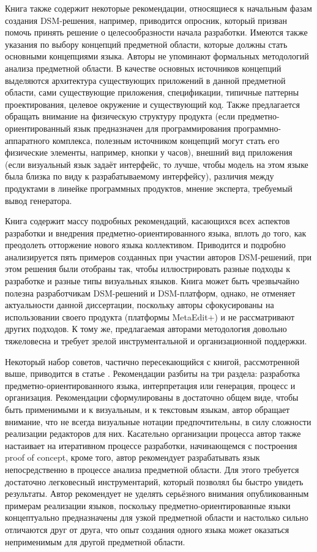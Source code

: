 Книга также содержит некоторые рекомендации, относящиеся к начальным фазам создания 
\ac{DSM}-решения, например, приводится опросник, который призван помочь принять решение о 
целесообразности начала разработки. Имеются также указания по выбору концепций предметной 
области, которые должны стать основными концепциями языка. Авторы не упоминают формальных 
методологий анализа предметной области. В качестве основных источников концепций выделяются 
архитектура существующих приложений в данной предметной области, сами существующие приложения, 
спецификации, типичные паттерны проектирования, целевое окружение и существующий код.
 Также предлагается обращать внимание на физическую структуру продукта (если предметно-ориентированный 
язык предназначен для программирования программно-аппаратного комплекса, полезным 
источником концепций могут стать его физические элементы, например, кнопки у часов), 
внешний вид приложения (если визуальный язык задаёт интерфейс, то лучше, чтобы модель 
на этом языке была близка по виду к разрабатываемому интерфейсу), различия между продуктами 
в линейке программных продуктов, мнение эксперта, требуемый вывод генератора.

Книга содержит массу подробных рекомендаций, касающихся всех аспектов разработки и 
внедрения предметно-ориентированного языка, вплоть до того, как преодолеть отторжение 
нового языка коллективом. Приводится и подробно анализируется пять примеров созданных 
при участии авторов \ac{DSM}-решений, при этом решения были отобраны так, чтобы иллюстрировать 
разные подходы к разработке и разные типы визуальных языков. Книга может быть чрезвычайно 
полезна разработчикам \ac{DSM}-решений и \ac{DSM}-платформ, однако, не отменяет актуальности 
данной диссертации, поскольку авторы сфокусированы на использовании своего продукта 
(платформы MetaEdit+) и не рассматривают других подходов. К тому же, предлагаемая 
авторами методология довольно тяжеловесна и требует зрелой инструментальной и организационной 
поддержки.

Некоторый набор советов, частично пересекающийся с книгой, рассмотренной выше, приводится 
в статье \cite{voelter2009best}. Рекомендации разбиты на три раздела: разработка предметно-ориентированного 
языка, интерпретация или генерация, процесс и организация. Рекомендации сформулированы 
в достаточно общем виде, чтобы быть применимыми и к визуальным, и к текстовым языкам, автор 
обращает внимание, что не всегда визуальные нотации предпочтительны, в силу сложности 
реализации редакторов для них. Касательно организации процесса автор также настаивает 
на итеративном процессе разработки, начинающемся с построения proof of concept, кроме 
того, автор рекомендует разрабатывать язык непосредственно в процессе анализа предметной 
области. Для этого требуется достаточно легковесный инструментарий, который позволял 
бы быстро увидеть результаты. Автор рекомендует не уделять серьёзного внимания опубликованным 
примерам реализации языков, поскольку предметно-ориентированные языки концептуально 
предназначены для узкой предметной области и настолько сильно отличаются друг от друга, 
что опыт создания одного языка может оказаться неприменимым для другой предметной области.

